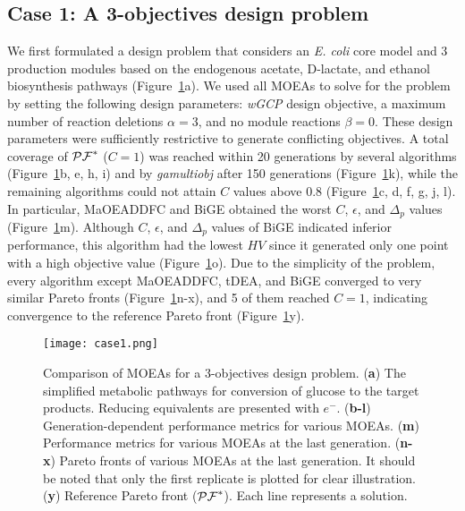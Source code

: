 {\subsection{Case 1: A 3-objectives design problem}
We first formulated a design problem that considers an \textit{E. coli} core model and 3 production modules based on the endogenous acetate, D-lactate, and ethanol biosynthesis pathways (Figure~\ref{fig4:case1}a). We used all MOEAs to solve for the problem by setting the following design parameters: \textit{wGCP} design objective, a maximum number of reaction deletions $\alpha=3$, and no module reactions $\beta=0$.
These design parameters were sufficiently restrictive to generate conflicting objectives.
A total coverage of $\mathcal{PF}^*$ ($C=1$)  was reached within 20 generations by several algorithms (Figure~\ref{fig4:case1}b, e, h, i) and by \textit{gamultiobj} after 150 generations (Figure~\ref{fig4:case1}k), while the remaining algorithms could not attain $C$ values above 0.8 (Figure~\ref{fig4:case1}c, d, f, g, j, l). In particular, MaOEADDFC and BiGE obtained the worst $C$, $\epsilon$, and $\Delta_p$ values (Figure~\ref{fig4:case1}m).
Although $C$, $\epsilon$, and $\Delta_p$ values of BiGE indicated inferior performance, this algorithm had the lowest $HV$ since it generated only one point with a high objective value (Figure~\ref{fig4:case1}o).
Due to the simplicity of the problem, every algorithm except MaOEADDFC, tDEA, and BiGE converged to very similar Pareto fronts (Figure~\ref{fig4:case1}n-x), and 5 of them reached $C=1$, indicating convergence to the reference Pareto front (Figure~\ref{fig4:case1}y).

\begin{figure}[p]
    \centering
    \texttt{[image: case1.png]}
    \caption[Comparison of MOEAs for a 3-objectives design problem]{Comparison of MOEAs for a 3-objectives design problem.
	(\textbf{a}) The simplified metabolic pathways for conversion of glucose to the target products. Reducing equivalents are presented with $e^-$.
	(\textbf{b-l}) Generation-dependent performance metrics for various MOEAs.
	(\textbf{m}) Performance metrics for various MOEAs at the last generation.
	(\textbf{n-x}) Pareto fronts of various MOEAs at the last generation. It should be noted that only the first replicate is plotted for clear illustration.
	(\textbf{y}) Reference Pareto front ($\mathcal{PF}^*$). Each line represents a solution.}
    \label{fig4:case1}
\end{figure}

}

